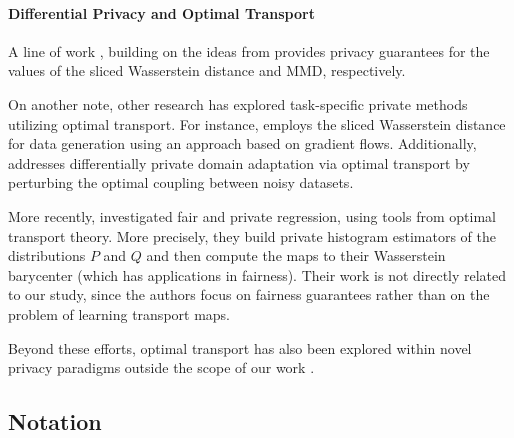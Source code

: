 \documentclass{article}
\theoremstyle{plain}
\theoremstyle{definition}
\theoremstyle{remark}
\begin{document}
\paragraph{Differential Privacy and Optimal Transport}
A line of work \cite{rakotomamonjy2021DPslicedWasserstein}, building on the ideas from \cite{harder2021dp} provides privacy guarantees for the values of the sliced Wasserstein distance and MMD, respectively. 

On another note, other research has explored task-specific private methods utilizing optimal transport. 
For instance, \cite{segag2023gradientFlow} employs the sliced Wasserstein distance for data generation using an approach based on gradient flows. 
Additionally, \cite{tien2019DPOTdomainAdapt} addresses differentially private domain adaptation via optimal transport by perturbing the optimal coupling between noisy datasets. 

More recently, \cite{xian2024DPfairRegression} investigated fair and private regression, using tools from optimal transport theory. More precisely, they build private histogram estimators of the distributions $P$ and $Q$ and then compute the maps to their Wasserstein barycenter (which has applications in fairness). Their work is not directly related to our study, since the authors focus on fairness guarantees rather than on the problem of learning transport maps.

Beyond these efforts, optimal transport has also been explored within novel privacy paradigms outside the scope of our work \cite{pierquin2024Pufferfish,Kawamoto2019localObfuscation,yang2024wassersteinDP}.

\subsection{Notation}
\end{document}
